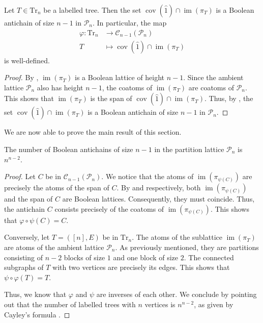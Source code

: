 \documentclass{preprint}
\newcommand{\im}{\operatorname{im}}
\newcommand{\cov}{\operatorname{cov}}
\newcommand{\cC}{\mathcal{C}}
\newcommand{\cP}{\mathcal{P}}
\theoremstyle{definition}
\begin{document}
\begin{lemma}\label{lem: phi}
Let $T\in \mathrm{Tr}_n$ be a labelled tree. Then the set $\cov(\hat{1})\cap \im(\pi_T)$ is a Boolean antichain of size $n-1$ in $\cP_n$. In particular, the map 
\begin{align*}
    \varphi:\mathrm{Tr}_n&\rightarrow \cC_{n-1}(\cP_n)\\
    T &\mapsto \cov(\hat{1})\cap{\im(\pi_T)}
\end{align*}
is well-defined.
\end{lemma}

\begin{proof}
    By , $\im(\pi_T)$ is a Boolean lattice of height $n-1$. Since the ambient lattice $\cP_n$ also has height $n-1$, the coatoms of $\im(\pi_T)$ are coatoms of $\cP_n$. This shows that $\im(\pi_T)$ is the span of $\cov(\hat{1})\cap{\im(\pi_T)}$.
    Thus, by , the set $\cov(\hat{1})\cap{\im(\pi_T)}$ is a Boolean antichain of size $n-1$ in $\cP_n$.
\end{proof}

We are now able to prove the main result of this section.

\begin{theorem}\label{thm: main_thm_partition_lattice}
    The number of Boolean antichains of size $n-1$ in the partition lattice $\cP_n$ is $n^{n-2}$.
\end{theorem}
\begin{proof}
Let $C$ be in $\cC_{n-1}(\cP_n)$. We notice that the atoms of $\im(\pi_{\psi(C)})$ are precisely the atoms of the span of $C$. By  and  respectively, both $\im(\pi_{\psi(C)})$ and the span of $C$ are Boolean lattices. Consequently, they must coincide. Thus, the antichain $C$ consists precisely of the coatoms of $\im(\pi_{\psi(C)})$. This shows that $\varphi\circ\psi (C) = C$.

Conversely, let $T = ([n], E)$ be in $\mathrm{Tr}_n$. The atoms of the sublattice $\im(\pi_T)$ are atoms of the ambient lattice $\cP_n$. As previously mentioned, they are partitions consisting of $n-2$ blocks of size $1$ and one block of size $2$. The connected subgraphs of $T$ with two vertices are precisely its edges. This shows that $\psi\circ \varphi(T)=T$.

Thus, we know that $\varphi$ and $\psi$ are inverses of each other. We conclude by pointing out that the number of labelled trees with $n$ vertices is $n^{n-2}$, as given by Cayley's formula \cite{Cayley1897trees}.
\end{proof}
\end{document}
